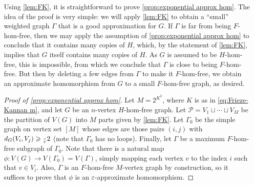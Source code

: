 \documentclass[reqno, english, 12pt]{amsart}
\theoremstyle{plain}
\theoremstyle{remark}
\renewcommand{\geq}{\geqslant}
\newcommand{\e}{\ensuremath{\varepsilon}}
\newcommand\p{\mathcal{P}}
\begin{document}
\noindent
Using \cref{lem:FK}, it is straightforward to prove \cref{prop:exponential approx hom}. The idea of the proof is very simple: we will apply \cref{lem:FK} to obtain a ``small'' weighted graph $\Gamma$ that is a good approximation for $G$. If $\Gamma$ is far from being $F$-hom-free, then we may apply the assumption of \cref{prop:exponential approx hom} to conclude that it contains many copies of $H$, which, by the statement of \cref{lem:FK}, implies that $G$ itself contains many copies of $H$. As $G$ is assumed to be $H$-hom-free, this is impossible, from which we conclude that $\Gamma$ is close to being $F$-hom-free. But then by deleting a few edges from $\Gamma$ to make it $F$-hom-free, we obtain an approximate homomorphism from $G$ to a small $F$-hom-free graph, as desired.
\begin{proof}[Proof of \cref{prop:exponential approx hom}]
	Let 
	$M = 2^{K^2}$, where $K$ is as in \eqref{eq:Frieze-Kannan m},
	and let $G$ be an $n$-vertex $H$-hom-free graph. Let $\p = V_1 \sqcup \dotsb \sqcup V_M$ be the partition of $V(G)$ into $M$ parts given by \cref{lem:FK}. Let $\Gamma_0$ be the simple graph on vertex set $[M]$ whose edges are those pairs $(i,j)$ with $d_G(V_i,V_j) \geq \frac\e2$ (note that $\Gamma_0$ has no loops). Finally, let $\Gamma$ be a maximum $F$-hom-free subgraph of $\Gamma_0$. Note that there is a natural map $\phi:V(G) \to V(\Gamma_0)=V(\Gamma)$, simply mapping each vertex $v$ to the index $i$ such that $v \in V_i$. Also, $\Gamma$ is an $F$-hom-free $M$-vertex graph by construction, so it suffices to prove that $\phi$ is an $\varepsilon$-approximate homomorphism.


\end{proof}
\end{document}
